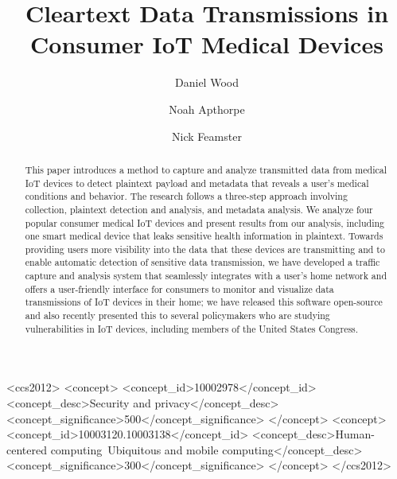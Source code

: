 \documentclass[sigconf]{acmart}
\begin{document}
\title{Cleartext Data Transmissions in Consumer IoT Medical Devices}


\author{Daniel Wood}

\author{Noah Apthorpe}

\author{Nick Feamster}


\renewcommand{\shortauthors}{D. Wood et al.}

\begin{abstract}
This paper introduces a method to
capture and analyze transmitted data from medical IoT devices to detect plaintext
payload and metadata that reveals a user's
medical conditions and
behavior. 
The research follows a three-step approach involving collection, plaintext detection
and analysis, and metadata analysis. 
We analyze four popular consumer medical IoT devices and present 
results from our analysis, including one smart medical device that leaks sensitive
health information in plaintext. 
Towards providing users more visibility into the data that these devices are transmitting
and to enable automatic detection of sensitive data transmission,
we have developed a traffic capture and analysis system that seamlessly integrates
with a user's home network and offers
a user-friendly interface for consumers to monitor and visualize data transmissions
of IoT devices in their home; we have released this software open-source and also
recently presented this to several policymakers who are studying vulnerabilities
in IoT devices, including members of the United States Congress.
\end{abstract}

%
%
\begin{CCSXML}
<ccs2012>
<concept>
<concept_id>10002978</concept_id>
<concept_desc>Security and privacy</concept_desc>
<concept_significance>500</concept_significance>
</concept>
<concept>
<concept_id>10003120.10003138</concept_id>
<concept_desc>Human-centered computing~Ubiquitous and mobile computing</concept_desc>
<concept_significance>300</concept_significance>
</concept>
</ccs2012>
\end{CCSXML}





\maketitle




 
\end{document}
